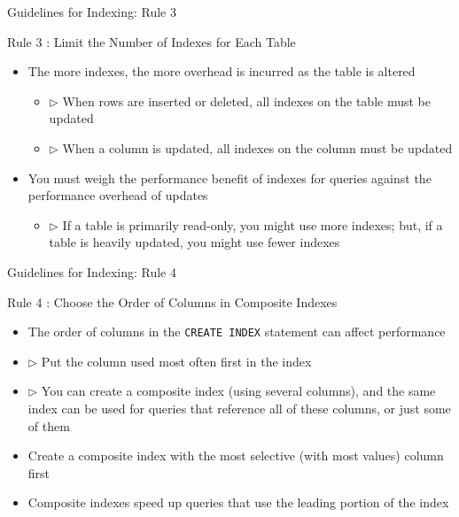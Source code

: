 \documentclass[aspectratio=169, xcolor=dvipsnames]{beamer}
\begin{document}
\begin{frame}{Guidelines for Indexing: Rule 3}
    \begin{alertblock}{Rule 3 : Limit the Number of Indexes for Each Table}
        \begin{itemize}[<+->]
            \item The more indexes, the more overhead is incurred as the table is altered
            \begin{itemize}[<+->]
                \item $\triangleright$ When rows are inserted or deleted, all indexes on the table must be updated
                \item $\triangleright$ When a column is updated, all indexes on the column must be updated
            \end{itemize}
            \item You must weigh the performance benefit of indexes for queries against the performance overhead of updates
            \begin{itemize}[<+->]
                \item $\triangleright$ If a table is primarily read-only, you might use more indexes; but, if a table is heavily updated, you might use fewer indexes
            \end{itemize}
        \end{itemize}
    \end{alertblock}
\end{frame}

\begin{frame}[fragile]{Guidelines for Indexing: Rule 4}
    \begin{alertblock}{Rule 4 : Choose the Order of Columns in Composite Indexes}
        \begin{itemize}[<+->]
            \item The order of columns in the \texttt{CREATE INDEX} statement can affect performance
            \item $\triangleright$ Put the column used most often first in the index
            \item $\triangleright$ You can create a composite index (using several columns), and the same index can be used for queries that reference all of these columns, or just some of them
            \item Create a composite index with the most selective (with most values) column first
            \item Composite indexes speed up queries that use the leading portion of the index
        \end{itemize}
    \end{alertblock}
\end{frame}
\end{document}

